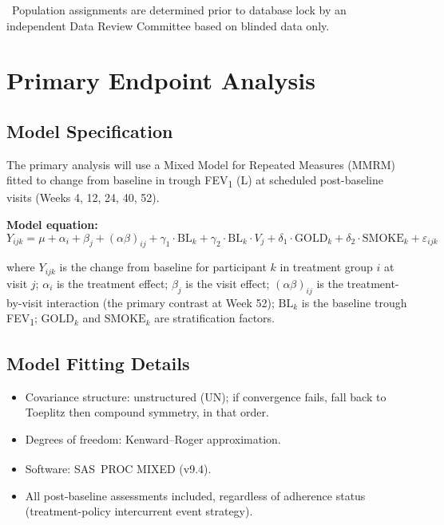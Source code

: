 \documentclass[11pt,a4paper]{article}
\begin{document}
\vspace{4pt}
{\small\color{sapgrey}\ Population assignments are determined prior to
database lock by an independent Data Review Committee based on blinded data only.}

\clearpage

\section{Primary Endpoint Analysis}

\subsection{Model Specification}

The primary analysis will use a Mixed Model for Repeated Measures (MMRM) fitted to
change from baseline in trough FEV\textsubscript{1} (L) at scheduled post-baseline visits
(Weeks 4, 12, 24, 40, 52).

\textbf{Model equation:}
\[
  Y_{ijk} = \mu + \alpha_i + \beta_j + (\alpha\beta)_{ij}
            + \gamma_1 \cdot \text{BL}_k + \gamma_2 \cdot \text{BL}_k \cdot V_j
            + \delta_1 \cdot \text{GOLD}_k + \delta_2 \cdot \text{SMOKE}_k + \varepsilon_{ijk}
\]

where $Y_{ijk}$ is the change from baseline for participant $k$ in treatment group $i$ at
visit $j$; $\alpha_i$ is the treatment effect; $\beta_j$ is the visit effect;
$(\alpha\beta)_{ij}$ is the treatment-by-visit interaction (the primary contrast at Week 52);
$\text{BL}_k$ is the baseline trough FEV\textsubscript{1}; $\text{GOLD}_k$ and
$\text{SMOKE}_k$ are stratification factors.

\subsection{Model Fitting Details}

\begin{itemize}[leftmargin=1.6em, itemsep=2pt]
  \item Covariance structure: unstructured (UN); if convergence fails, fall back to
        Toeplitz then compound symmetry, in that order.
  \item Degrees of freedom: Kenward--Roger approximation.
  \item Software: SAS\textsuperscript{\textregistered}\ PROC MIXED (v9.4).
  \item All post-baseline assessments included, regardless of adherence status
        (treatment-policy intercurrent event strategy).
\end{itemize}
\end{document}
